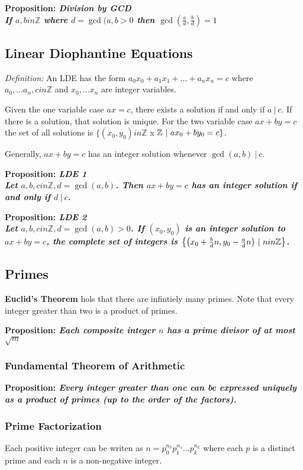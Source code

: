 \documentclass[12pt]{article}
\newcommand{\divides}{\ \!|\ \!}
\newcommand{\proposition}[1]{{\bf Proposition: \textit{#1}}}
\begin{document}
\proposition{Division by GCD\\
If $a,b in \mathbb{Z}$ where $d = \gcd(a,b > 0$ then $\gcd(\frac{a}{d},\frac{b}{d}) = 1$}

\subsection*{Linear Diophantine Equations}
\textit{Definition: } An LDE has the form $a_0x_0 + a_1x_1 + ... + a_nx_n = c$ where $a_0, ... a_n, c in \mathbb{Z}$ and $x_0, ... x_n$ are integer variables.

Given the one variable case $ax = c$, there exists a solution if and only if $a\divides c$. If there is a solution, that solution is unique. For the two variable case $ax + by = c$ the set of all solutions is $\{ (x_0, y_0) in \mathbb{Z}$ x $\mathbb{Z} \ |\  ax_0 + by_0 = c \}$.

Generally, $ax + by = c$ has an integer solution whenever $\gcd(a,b)\divides c$.

\proposition{LDE 1\\
Let $a,b,c in \mathbb{Z}, d = \gcd(a,b)$. Then $ax + by = c$ has an integer solution if and only if $d\divides c$.}

\proposition{LDE 2\\
Let $a,b,c in \mathbb{Z}, d = \gcd(a,b) > 0$. If $(x_0, y_0)$ is an integer solution to $ax + by = c$, the complete set of integers is $\bigl\{ \bigl( x_0 + \frac{b}{d}n, y_0 - \frac{a}{d}n \bigl) \ |\  n in \mathbb{Z} \bigl\}$.}

\subsection*{Primes}
{\bf Euclid's Theorem} hols that there are infintiely many primes. Note that every integer greater than two is a product of primes.

\proposition{Each composite integer $n$ has a prime divisor of at most $\sqrt{m}$}

\subsubsection*{Fundamental Theorem of Arithmetic}
\proposition{Every integer greater than one can be expressed uniquely as a product of primes (up to the order of the factors).}

\subsubsection*{Prime Factorization}
Each positive integer can be writen as $n = p_0^{n_0} p_1^{n_1} ... p_k^{n_k}$ where each $p$ is a distinct prime and each $n$ is a non-negative integer.
\end{document}
